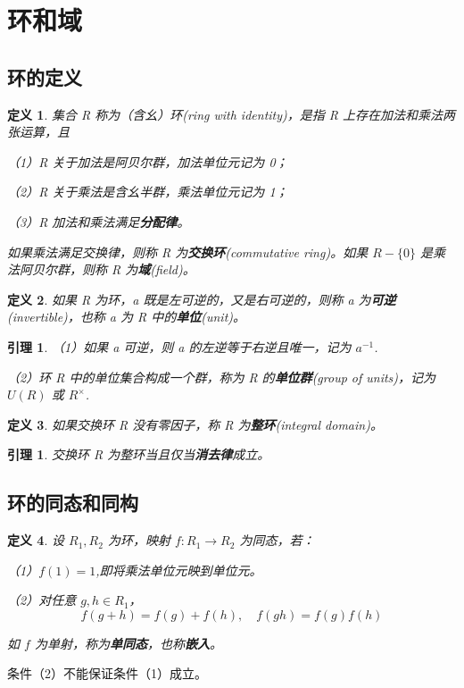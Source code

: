 \documentclass{ctexart}
\newtheorem{definition}{\indent 定义}[section]
\newtheorem{lemma}[theorem]{\indent 引理}
\begin{document}
\section{环和域}

\subsection{环的定义}

\begin{definition}
    集合 R 称为（含幺）环(ring with identity)，是指 R 上存在加法和乘法两张运算，且

    （1）R 关于加法是阿贝尔群，加法单位元记为 0；

    （2）R 关于乘法是含幺半群，乘法单位元记为 1；

    （3）R 加法和乘法满足\textbf{分配律}。

    如果乘法满足交换律，则称 R 为\textbf{交换环}(commutative ring)。如果 $R - \{0\}$ 是乘法阿贝尔群，则称 R 为\textbf{域}(field)。
\end{definition}

\begin{definition}
    如果 R 为环，a 既是左可逆的，又是右可逆的，则称 a 为\textbf{可逆}(invertible)，也称 a 为 R 中的\textbf{单位}(unit)。
\end{definition}


\begin{lemma}
    （1）如果 a 可逆，则 a 的左逆等于右逆且唯一，记为 $a^{-1}$.

    （2）环 R 中的单位集合构成一个群，称为 R 的\textbf{单位群}(group of units)，记为 $U(R)$ 或 $R^{\times}$.
\end{lemma}

\begin{definition}
    如果交换环 R 没有零因子，称 R 为\textbf{整环}(integral domain)。
\end{definition}

\begin{lemma}
    交换环 R 为整环当且仅当\textbf{消去律}成立。
\end{lemma}

\subsection{环的同态和同构}

\begin{definition}
    设 $R_1,R_2$ 为环，映射 $f: R_1 \rightarrow R_2$ 为同态，若：

    （1）$f(1) = 1$,即将乘法单位元映到单位元。
    
    （2）对任意 $g,h \in R_1$，
    \[
    f(g+h) = f(g) + f(h),\quad f(gh) = f(g)f(h)
    \]

    如 $f$ 为单射，称为\textbf{单同态}，也称\textbf{嵌入}。

\end{definition}

条件（2）不能保证条件（1）成立。
\end{document}
